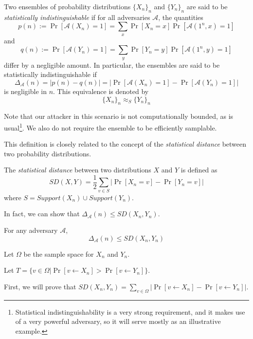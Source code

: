 \documentclass[12pt]{tufte-book}
\newcommand{\ma}{\mathcal{A}}
\begin{document}
\begin{definition}
    Two ensembles of probability distributions $\{X_n\}_n$ and $\{Y_n\}_n$ are said to be \emph{statistically indistinguishable} if for all adversaries $\ma$, the quantities
    $$p(n) := \Pr[\ma(X_n) = 1] = \sum_x \Pr[X_n = x]\Pr[\ma(1^n,x) = 1]$$
    and
    $$q(n) := \Pr[\ma(Y_n) = 1] = \sum_y \Pr[Y_n = y]\Pr[\ma(1^n,y) = 1]$$
    differ by a negligible amount.
    In particular, the ensembles are said to be statistically indistinguishable if
    $$\Delta_\ma(n) = |p(n) - q(n)| = |\Pr[\ma(X_n) = 1] - \Pr[\ma(Y_n) = 1]|$$
    is negligible in $n$.
This equivalence is denoted by
$$\{X_n\}_n \approx_S \{Y_n\}_n$$
\end{definition}
Note that our attacker in this scenario is not computationally bounded, as is usual\footnote{Statistical indistinguishability is a very strong requirement, and it makes use of a very powerful adversary, so it will serve mostly as an illustrative example.}.
We also do not require the ensemble to be efficiently samplable.

This definition is closely related to the concept of the \textit{statistical distance} between two probability distributions.
\begin{definition}
The \emph{statistical distance} between two distributions $X$ and $Y$ is defined as
$$SD(X, Y) = \frac{1}{2}\sum\limits_{v \in S}|\Pr[X_n = v] - \Pr[Y_n = v]|$$
where $S = Support(X_n) \cup Support(Y_n)$.
\end{definition}
In fact, we can show that $\Delta_{\ma}(n) \le SD(X_n, Y_n)$.
\begin{lemma}[Relationship between $SD$ and $\Delta_\ma$]
    For any adversary $\ma$,
    $$\Delta_{\ma}(n) \le SD(X_n, Y_n)$$
\end{lemma}

\proof
Let $\Omega$ be the sample space for $X_n$ and $Y_n$.

Let $T = \{v \in \Omega | \Pr[v \leftarrow X_n] > \Pr[v \leftarrow Y_n]\}$.

First, we will prove that $SD(X_n, Y_n) = \sum\limits_{v \in \Omega} |\Pr[v \leftarrow X_n] - \Pr[v \leftarrow Y_n]|$.
\end{document}
